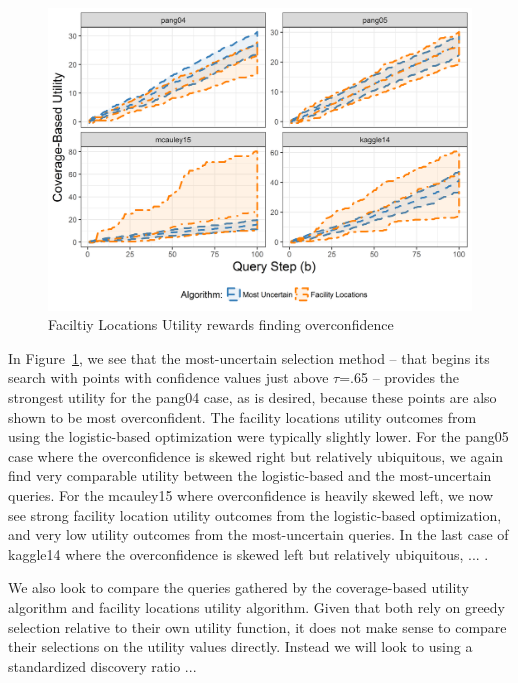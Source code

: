 \documentclass[letterpaper]{article} %
\newcommand{\km}[1]{{\color{red} #1}} %
\begin{document}
\begin{figure}[t]
 \centering
  \includegraphics[width=\textwidth]{../experimentsAndPlots/flUtilPlaceholder.png}
  \caption{Faciltiy Locations Utility rewards finding overconfidence}
  \label{fig:flutil}
\end{figure}

In Figure~\ref{fig:flutil}, we see that the most-uncertain selection method – that begins its search with points with confidence values just above $\tau$=.65 – provides the strongest utility for the pang04 case, as is desired, because these points are also shown to be most overconfident. The facility locations utility outcomes from using the logistic-based optimization were typically slightly lower. For the pang05 case where the overconfidence is skewed right but relatively ubiquitous, we again find very comparable utility between the logistic-based and the most-uncertain queries. For the mcauley15 where overconfidence is heavily skewed left, we now see strong facility location utility outcomes from the logistic-based optimization, and very low utility outcomes from the most-uncertain queries. \km{In the last case of kaggle14 where the overconfidence is skewed left but relatively ubiquitous, ...} . 

We also look to compare the queries gathered by the coverage-based utility algorithm and facility locations utility algorithm. Given that both rely on greedy selection relative to their own utility function, it does not make sense to compare their selections on the utility values directly. Instead we will look to using a standardized discovery ratio \km{...}
\end{document}
